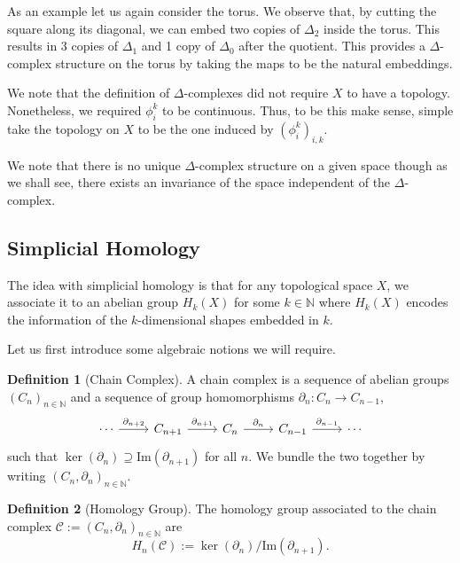 \documentclass[]{article}
\theoremstyle{definition}
\theoremstyle{definition}
\newtheorem{definition}{Definition}[section]
\begin{document}
As an example let us again consider the torus. We observe that, by cutting 
the square along its diagonal, we can embed two copies of \(\Delta_2\) inside 
the torus. This results in 3 copies of \(\Delta_1\) and 1 copy of \(\Delta_0\) 
after the quotient.  This provides a \(\Delta\)-complex structure on the torus 
by taking the maps to be the natural embeddings. 

We note that the definition of \(\Delta\)-complexes did not require \(X\) 
to have a topology. Nonetheless, we required \(\phi_i^k\) to be continuous. 
Thus, to be this make sense, simple take the topology on \(X\) to be the 
one induced by \((\phi_i^k)_{i, k}\).

We note that there is no unique \(\Delta\)-complex structure on a given 
space though as we shall see, there exists an invariance of the space independent 
of the \(\Delta\)-complex.

\subsection{Simplicial Homology}

The idea with simplicial homology is that for any topological space \(X\), 
we associate it to an abelian group \(H_k(X)\) for some \(k \in \mathbb{N}\) 
where \(H_k(X)\) encodes the information of the \(k\)-dimensional shapes 
embedded in \(k\). 

Let us first introduce some algebraic notions we will require. 

\begin{definition}[Chain Complex]
  A chain complex is a sequence of abelian groups \((C_n)_{n \in \mathbb{N}}\)
  and a sequence of group homomorphisms \(\partial_n : C_n \to C_{n - 1}\),
  \[\begin{tikzcd}
    \cdots & {C_{n+1}} & {C_n} & {C_{n-1}} & \cdots
    \arrow["{\partial_{n+2}}", from=1-1, to=1-2]
    \arrow["{\partial_{n+1}}", from=1-2, to=1-3]
    \arrow["{\partial_n}", from=1-3, to=1-4]
    \arrow["{\partial_{n-1}}", from=1-4, to=1-5]
  \end{tikzcd}\]
  such that \(\ker(\partial_n) \supseteq \text{Im}(\partial_{n + 1})\) for all \(n\).
  We bundle the two together by writing \((C_n, \partial_n)_{n \in \mathbb{N}}\).
\end{definition}

\begin{definition}[Homology Group]
  The homology group associated to the chain complex 
  \(\mathcal{C} := (C_n, \partial_n)_{n \in \mathbb{N}}\) are 
  \[H_n(\mathcal{C}) := \ker(\partial_n) / \text{Im}(\partial_{n + 1}).\]
\end{definition}
\end{document}
